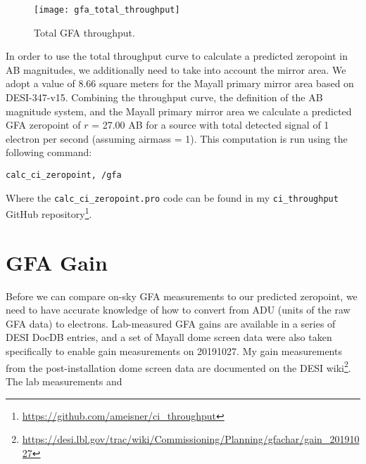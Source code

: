 \documentclass{article}
\begin{document}
\begin{figure*}[ht]
        \texttt{[image: gfa\_total\_throughput]}
    \caption{Total GFA throughput.}
    \label{fig:total_throughput}
\end{figure*}


In order to use the total throughput curve to calculate a predicted zeropoint in AB magnitudes, we additionally need to take into account the mirror area. We adopt a value of 8.66 square meters for the Mayall primary mirror area based on DESI-347-v15. Combining the throughput curve, the definition of the AB magnitude system, and the Mayall primary mirror area we calculate a predicted GFA zeropoint of $r$ = 27.00 AB for a source with total detected signal of 1 electron per second (assuming airmass = 1). This computation is run using the following command:

\verb|calc_ci_zeropoint, /gfa|

\noindent
Where the \verb|calc_ci_zeropoint.pro| code can be found in my \verb|ci_throughput| GitHub repository\footnote{\url{https://github.com/ameisner/ci_throughput}}.


\section{GFA Gain}

Before we can compare on-sky GFA measurements to our predicted zeropoint, we need to have accurate knowledge of how to convert from ADU (units of the raw GFA data) to electrons. Lab-measured GFA gains are available in a series of DESI DocDB entries, and a set of Mayall dome screen data were also taken specifically to enable gain measurements on 20191027. My gain measurements from the post-installation dome screen data are documented on the DESI wiki\footnote{\url{https://desi.lbl.gov/trac/wiki/Commissioning/Planning/gfachar/gain_20191027}}. The lab measurements and 


\end{document}
